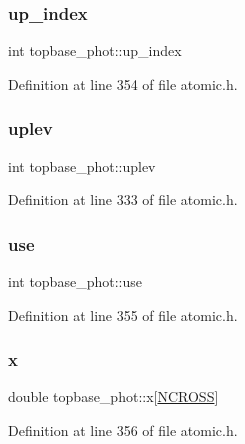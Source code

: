 \subsubsection{\texorpdfstring{up\+\_\+index}{up\_index}}
{\footnotesize\ttfamily int topbase\+\_\+phot\+::up\+\_\+index}



Definition at line 354 of file atomic.\+h.

\mbox{\label{structtopbase__phot_aa07be8946fb5a7bb165ee7f3e90aeb7c}} 
\subsubsection{\texorpdfstring{uplev}{uplev}}
{\footnotesize\ttfamily int topbase\+\_\+phot\+::uplev}



Definition at line 333 of file atomic.\+h.

\mbox{\label{structtopbase__phot_a01a398b80c1488717ec6461de77dbd7d}} 
\subsubsection{\texorpdfstring{use}{use}}
{\footnotesize\ttfamily int topbase\+\_\+phot\+::use}



Definition at line 355 of file atomic.\+h.

\mbox{\label{structtopbase__phot_aa15794821f59dce49173ad06ae48c1df}} 
\subsubsection{\texorpdfstring{x}{x}}
{\footnotesize\ttfamily double topbase\+\_\+phot\+::x\mbox{[}\hyperlink{atomic_8h_a9012fd4c06f8e07e4288a6c441c44b63}{N\+C\+R\+O\+SS}\mbox{]}}



Definition at line 356 of file atomic.\+h.

\mbox{\label{structtopbase__phot_a2c145af1ccb60672e5c8c2925961ea2f}} 
